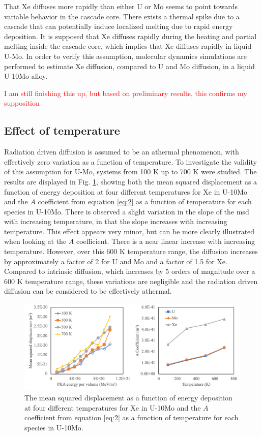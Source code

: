 \documentclass[review]{elsarticle}
\begin{document}
That Xe diffuses more rapidly than either U or Mo seems to point towards variable behavior in the cascade core. There exists a thermal spike due to a cascade that can potentially induce localized melting due to rapid energy deposition. It is supposed that Xe diffuses rapidly during the heating and partial melting inside the cascade core, which implies that Xe diffuses rapidly in liquid U-Mo. In order to verify this assumption, molecular dynamics simulations are performed to estimate Xe diffusion, compared to U and Mo diffusion, in a liquid U-10Mo alloy. 

\textcolor{red}{I am still finishing this up, but based on preliminary results, this confirms my supposition} 



\FloatBarrier

\subsection{Effect of temperature}

Radiation driven diffusion is assumed to be an athermal phenomenon, with effectively zero variation as a function of temperature. To investigate the validity of this assumption for U-Mo, systems from 100 K up to 700 K were studied. The results are displayed in Fig. \ref{fig:msdT}, showing both the mean squared displacement as a function of energy deposition at four different temperatures for Xe in U-10Mo and the $A$ coefficient from equation \ref{eq:2} as a function of temperature for each species in U-10Mo. There is observed a slight variation in the slope of the msd with increasing temperature, in that the slope increases with increasing temperature. This effect appears very minor, but can be more clearly illustrated when looking at the $A$ coefficient. There is a near linear increase with increasing temperature. However, over this 600 K temperature range, the diffusion increases by approximately a factor of 2 for U and Mo and a factor of 1.5 for Xe. Compared to intrinsic diffusion, which increases by 5 orders of magnitude over a 600 K temperature range, these variations are negligible and the radiation driven diffusion can be considered to be effectively athermal. 

\begin{figure}[h]
 \centering
 \includegraphics[width=1.0\textwidth]{msdT.png} 
 \caption{The mean squared displacement as a function of energy deposition at four different temperatures for Xe in U-10Mo and the $A$ coefficient from equation \ref{eq:2} as a function of temperature for each species in U-10Mo. }
 \label{fig:msdT}
\end{figure}
\end{document}
